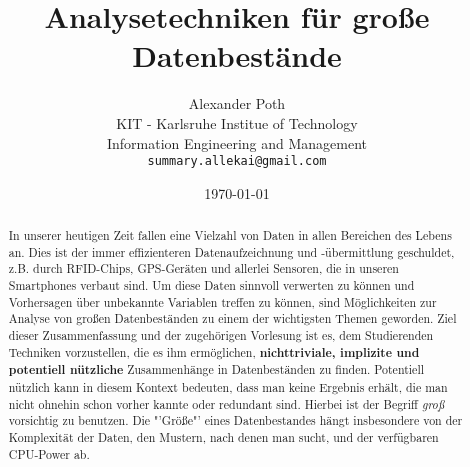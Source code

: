 \documentclass[12pt,a4paper]{article}
\begin{document}
\title{Analysetechniken für große Datenbestände}
\author{Alexander Poth \\
	KIT - Karlsruhe Institue of Technology \\
	Information Engineering and Management\\
	\texttt{summary.allekai@gmail.com}}
\date{\today}
\maketitle
\newpage
\begin{abstract}
In unserer heutigen Zeit fallen eine Vielzahl von Daten in allen Bereichen des 
Lebens an. Dies ist der immer effizienteren Datenaufzeichnung und -übermittlung 
geschuldet, z.B. durch RFID-Chips, GPS-Geräten und allerlei Sensoren, die in
unseren Smartphones verbaut sind. Um diese Daten sinnvoll verwerten zu können und
Vorhersagen über unbekannte Variablen treffen zu können, sind Möglichkeiten zur 
Analyse von großen Datenbeständen zu einem der wichtigsten Themen geworden. Ziel 
dieser Zusammenfassung und der zugehörigen Vorlesung ist es, dem Studierenden 
Techniken vorzustellen, die es ihm ermöglichen, \textbf{nichttriviale, implizite 
und potentiell nützliche} Zusammenhänge in Datenbeständen zu finden. Potentiell nützlich 
kann in diesem Kontext bedeuten, dass man keine Ergebnis erhält, die man nicht ohnehin 
schon vorher kannte oder redundant sind. Hierbei ist der Begriff \textit{groß} 
vorsichtig zu benutzen. Die "'Größe"' eines Datenbestandes hängt insbesondere von der
Komplexität der Daten, den Mustern, nach denen man sucht, und der verfügbaren CPU-Power ab.
\end{abstract}
\newpage
\tableofcontents
\newpage
{}


\newpage

\newpage

\newpage

\newpage

\newpage

\newpage

\newpage

\newpage

\newpage

\newpage


\FloatBarrier


	
\end{document}
